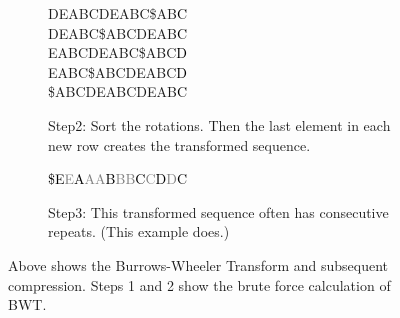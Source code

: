 \begin{figure}
\begin{subfigure}{.3\linewidth}
{DEABCDEABC\$AB\textcolor{black}{C}\\
DEABC\$ABCDEAB\textcolor{black}{C}\\
EABCDEABC\$ABC\textcolor{black}{D}\\
EABC\$ABCDEABC\textcolor{black}{D}\\
\$ABCDEABCDEAB\textcolor{black}{C}\\
}
\caption{Step2: Sort the rotations. Then the last element in each new row creates the transformed sequence.}
\label{fig:bwtStep2}
\end{subfigure}
\begin{subfigure}{.3\linewidth}
\footnotesize
\textcolor{gray}{\textcolor{black}{\$E}E\textcolor{black}{A}AA\textcolor{black}{B}BB\textcolor{black}{C}C\textcolor{black}{D}D\textcolor{black}{C}}\\
\caption{Step3: This transformed sequence often has consecutive repeats. (This example does.)}
\label{fig:bwtStep3}
\end{subfigure}
\caption[Burrows Wheeler Transform]{Above shows the Burrows-Wheeler Transform and subsequent compression. Steps 1 and 2 show the brute force calculation of BWT.}
\label{fig:bwt}
\end{figure}
